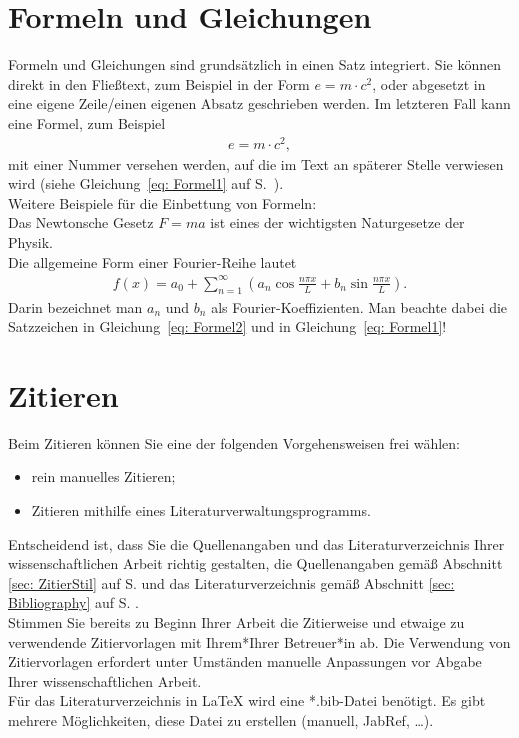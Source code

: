 \section{Formeln und Gleichungen}
Formeln und Gleichungen sind grundsätzlich in einen Satz integriert. Sie können direkt in den Fließtext, zum Beispiel in der Form $e=m\cdot c^2$, oder abgesetzt in eine eigene Zeile/einen eigenen Absatz geschrieben werden.
Im letzteren Fall kann eine Formel, zum Beispiel
%
\begin{align}
	e=m\cdot c^2,
	\label{eq: Formel1}
\end{align}
%
mit einer Nummer versehen werden, auf die im Text an späterer Stelle verwiesen wird (siehe Gleichung~\ref{eq: Formel1} auf S.~\pageref{eq: Formel1}).
\vspace{6pt}\\
Weitere Beispiele für die Einbettung von Formeln:
\\
Das Newtonsche Gesetz $F=ma$ ist eines der wichtigsten Naturgesetze der Physik.
\\
Die allgemeine Form einer Fourier-Reihe lautet
%
\begin{align}
	f(x)=a_0 +\sum_{n=1}^\infty \left( a_n \cos\frac{n\pi x}{L} + b_n \sin\frac{n\pi x}{L} \right) .
	\label{eq: Formel2}
\end{align}
%
Darin bezeichnet man $a_n$ und $b_n$ als Fourier-Koeffizienten. Man beachte dabei die Satzzeichen
in Gleichung~\ref{eq: Formel2} und in Gleichung~\ref{eq: Formel1}!

\section{Zitieren}
Beim Zitieren können Sie eine der folgenden Vorgehensweisen frei wählen:
\begin{itemize}
	\item rein manuelles Zitieren;
	\item Zitieren mithilfe eines Literaturverwaltungsprogramms.
\end{itemize}
Entscheidend ist, dass Sie die Quellenangaben und das Literaturverzeichnis Ihrer wissenschaftlichen Arbeit richtig gestalten, \dah die Quellenangaben gemäß Abschnitt \ref{sec: ZitierStil} auf S. \pageref{sec: ZitierStil} und das Literaturverzeichnis gemäß Abschnitt \ref{sec: Bibliography} auf S. \pageref{sec: Bibliography}.\\
Stimmen Sie bereits zu Beginn Ihrer Arbeit die Zitierweise und etwaige zu verwendende Zitiervorlagen mit Ihrem*Ihrer Betreuer*in ab. Die Verwendung von Zitiervorlagen erfordert unter Umständen manuelle Anpassungen vor Abgabe Ihrer wissenschaftlichen Arbeit.\\
Für das Literaturverzeichnis in {\LaTeX} wird eine *.bib-Datei benötigt. Es gibt mehrere Möglichkeiten, diese Datei zu erstellen (manuell, JabRef, \dots).

